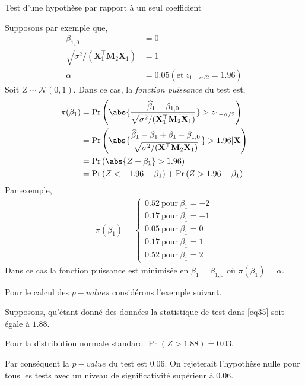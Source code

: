 \begin{frame}[allowframebreaks]{Test d'une hypothèse par rapport à un seul coefficient}
\medskip

Supposons par exemple que,
\begin{align*}
\beta_{1,0} &= 0\\
 \sqrt{\sigma^2/(\mathbf{X}_1^\top\mathbf{M}_2\mathbf{X}_1)} &=1\\
 \alpha &=0.05(\textrm{et} \ z_{1-\alpha/2} = 1.96) 
\end{align*}
Soit $Z \sim \mathcal{N}(0,1)$. Dans ce cas, la \emph{fonction puissance} du test est,
\begin{align*}
\pi(\beta_1) &= \Pr\left( \abs{\frac{\widehat{\beta}_1 - \beta_{1,0}}{ \sqrt{\sigma^2/(\mathbf{X}_1^\top\mathbf{M}_2\mathbf{X}_1)}}} > z_{1-\alpha/2} \right)\\
&= \Pr\left( \abs{\frac{\widehat{\beta}_1 - \beta_1+\beta_1 -\beta_{1,0}}{ \sqrt{\sigma^2/(\mathbf{X}_1^\top\mathbf{M}_2\mathbf{X}_1)}}} > 1.96 | \mathbf{X} \right)\\
&=\Pr\left(\abs{Z + \beta_1} > 1.96\right)\\
&= \Pr\left( Z < -1.96 - \beta_1\right)+ \Pr\left( Z > 1.96 - \beta_1\right)
\end{align*}
Par exemple,
\begin{align*}
\pi(\beta_1) =
\left\{
\begin{array}{c}
0.52 \ \textrm{pour} \ \beta_1 = -2\\
0.17 \ \textrm{pour} \ \beta_1 = -1\\
0.05 \ \textrm{pour} \ \beta_1 = 0\\
0.17 \ \textrm{pour} \ \beta_1 = 1\\
0.52 \ \textrm{pour} \ \beta_1 = 2
\end{array}
\right.
\end{align*}
Dans ce cas la fonction puissance est minimisée en $\beta_1 = \beta_{1,0}$ où $\pi(\beta_1) = \alpha$.

\medskip

Pour le calcul des $p-values$ considérons l'exemple suivant.

\medskip

 Supposons, qu'étant donné des données la statistique de test  dans \eqref{eq35} soit égale à $1.88$. 

\medskip
 
 Pour la distribution normale standard $\Pr(Z > 1.88) = 0.03$. 
 
\medskip 

 Par conséquent la $p-value$ du test est $0.06$. On rejeterait l'hypothèse nulle pour tous les tests avec un niveau de significativité supérieur à $0.06$.
 

\end{frame}
